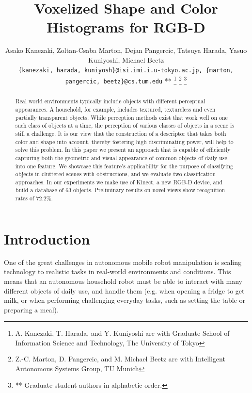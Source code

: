 \documentclass[a4paper, 10 pt, conference]{sty/ieeeconf}
\title{\LARGE \bf 
Voxelized Shape and Color Histograms for RGB-D}
\author{Asako Kanezaki, Zoltan-Csaba Marton, Dejan Pangercic, Tatsuya Harada, Yasuo Kuniyoshi, Michael Beetz\\%
{\tt\small \{kanezaki, harada, kuniyosh\}@isi.imi.i.u-tokyo.ac.jp, \{marton, pangercic, beetz\}@cs.tum.edu} **
\thanks{A. Kanezaki, T. Harada, and Y. Kuniyoshi are with Graduate School of Information Science and Technology, The University of Tokyo
}
\thanks{Z.-C. Marton, D. Pangercic, and M. Michael Beetz are with Intelligent Autonomous Systems Group, TU Munich
}
\thanks{** Graduate student authors in alphabetic order.}
}
\begin{document}
\newcommand{\todo}[1]{\textbf{\textcolor{red}{TODO: #1}}}
\maketitle
\thispagestyle{empty}
\pagestyle{empty}

\begin{abstract}
Real world environments typically include objects with different perceptual appearances.
A household, for example, includes textured, textureless and even partially transparent objects.
While perception methods exist that work well on one such class of objects at a time, the perception of
various classes of objects in a scene is still a challenge.
It is our view that the construction of a descriptor that takes both color and shape into account,
thereby fostering high discriminating power, will help to solve this problem.
In this paper we present an approach that is capable of efficiently capturing both the geometric
and visual appearance of common objects of daily use into one feature.
We showcase this
feature's applicability for the purpose of classifying objects in cluttered scenes with obstructions,
and we evaluate two classification approaches.
In our experiments we make use of Kinect, a new RGB-D device,
and build a database of 63 objects. Preliminary results
on novel views show recognition rates of 72.2\%.
\end{abstract}


\section{Introduction}
One of the great challenges in autonomous mobile robot manipulation is scaling
technology to realistic tasks in real-world environments and
conditions. This means that an autonomous household robot must be able to interact with many
different objects of daily use, and handle them (e.g. when
opening a fridge to get milk, or when performing challenging everyday tasks,
such as setting the table or preparing a meal).
\end{document}
